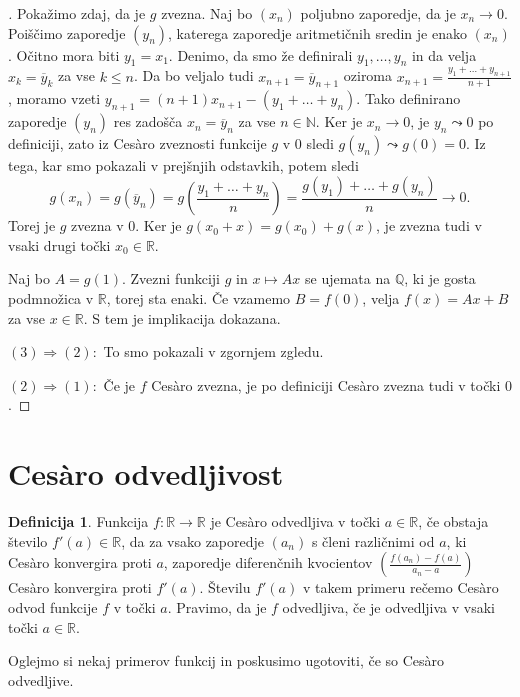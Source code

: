 \documentclass[a4paper,12pt]{article}
\theoremstyle{definition}
\newtheorem{definicija}{Definicija}
\theoremstyle{plain}
\newenvironment{dokaz}{\begin{proof}[\bfseries\upshape\proofname]}{\end{proof}}
\begin{document}
\begin{dokaz}
    Pokažimo zdaj, da je $g$ zvezna. Naj bo $(x_n)$ poljubno zaporedje, da je $x_n \rightarrow 0$. Poiščimo zaporedje $(y_n)$, katerega zaporedje aritmetičnih sredin je enako $(x_n)$. Očitno mora biti $y_1 = x_1$. Denimo, da smo že definirali $y_1, \ldots, y_n$ in da velja $x_k = \overline{y}_k$ za vse $k \leq n$. Da bo veljalo tudi $x_{n+1} = \overline{y}_{n+1}$ oziroma $x_{n+1} = \frac{y_1 + \ldots + y_{n+1}}{n+1}$, moramo vzeti $y_{n+1} = (n+1)x_{n+1} - (y_1 + \ldots + y_n)$. Tako definirano zaporedje $(y_n)$ res zadošča $x_n = \overline{y}_n$ za vse $n \in \mathbb{N}$. Ker je $x_n \rightarrow 0$, je $y_n \leadsto 0$ po definiciji, zato iz Ces\`{a}ro zveznosti funkcije $g$ v $0$ sledi $g(y_n) \leadsto g(0) = 0$. Iz tega, kar smo pokazali v prejšnjih odstavkih, potem sledi 
    $$g(x_n) = g(\overline{y}_n) = g(\frac{y_1 + \ldots + y_n}{n}) = \frac{g(y_1) + \ldots + g(y_n)}{n} \rightarrow 0.$$
    Torej je $g$ zvezna v $0$. Ker je $g(x_0 + x) = g(x_0) + g(x)$, je zvezna tudi v vsaki drugi točki $x_0 \in \mathbb{R}$.

    Naj bo $A = g(1)$. Zvezni funkciji $g$ in $x \mapsto Ax$ se ujemata na $\mathbb{Q}$, ki je gosta podmnožica v $\mathbb{R}$, torej sta enaki. Če vzamemo $B = f(0)$, velja $f(x) = Ax + B$ za vse $x \in \mathbb{R}$. S tem je implikacija dokazana.

    $(3) \Rightarrow (2): $ To smo pokazali v zgornjem zgledu.

    $(2) \Rightarrow (1): $ Če je $f$ Ces\`{a}ro zvezna, je po definiciji Ces\`{a}ro zvezna tudi v točki $0$.
\end{dokaz}


\section{Ces\`{a}ro odvedljivost}
\begin{definicija}
    Funkcija $f: \mathbb{R} \rightarrow \mathbb{R}$ je Ces\`{a}ro odvedljiva v točki $a \in \mathbb{R}$, če obstaja število $f'(a) \in \mathbb{R}$, da za vsako zaporedje $(a_n)$ s členi različnimi od $a$, ki Ces\`{a}ro konvergira proti $a$, zaporedje diferenčnih kvocientov $(\frac{f(a_n)-f(a)}{a_n-a})$ Ces\`{a}ro konvergira proti $f'(a)$. Številu $f'(a)$ v takem primeru rečemo Ces\`{a}ro odvod funkcije $f$ v točki $a$. Pravimo, da je $f$ odvedljiva, če je odvedljiva v vsaki točki $a \in \mathbb{R}$.
\end{definicija}

Oglejmo si nekaj primerov funkcij in poskusimo ugotoviti, če so Ces\`{a}ro odvedljive.
\end{document}
